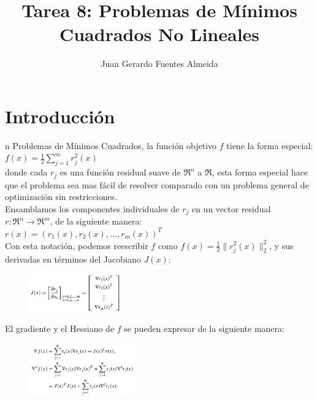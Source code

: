 \documentclass[10pt,journal,compsoc]{styles/IEEEtran}
\title{Tarea 8: Problemas de M\'inimos Cuadrados No Lineales}
\author{Juan Gerardo Fuentes Almeida}
\begin{document}
\maketitle

\IEEEdisplaynontitleabstractindextext

\IEEEpeerreviewmaketitle

\section{Introducci\'on}

n Problemas de Mínimos Cuadrados, la función objetivo $f$ tiene la forma especial:\\
 
 $f(x)=\frac{1}{2} \sum \limits_{j=1}^{m} r^2_j (x)$\\
 
donde cada $r_j$ es una función residual suave de $\Re^n$ a $\Re$, esta forma especial hace que el problema sea mas fácil de resolver comparado con un problema general de optimización sin restricciones.\\

Ensamblamos los componentes individuales de $r_j$ en un vector residual $r:\Re^n \rightarrow \Re^m$, de la siguiente manera:\\

$r(x)=(r_1(x),r_2(x),...,r_m(x))^T$\\

Con esta notación, podemos reescribir $f$ como $f(x)=\frac{1}{2} \parallel r^2_j (x) \parallel _2^2$, y sus derivadas en términos del Jacobiano $J(x)$:\\

\begin{figure}[hbtp]
\centering
\includegraphics[width=0.35\textwidth]{Jacobian.png}
\caption*{}
\end{figure}

El gradiente y el Hessiano de $f$ se pueden expresar de la siguiente manera:\\

\begin{figure}[hbtp]
\centering
\includegraphics[width=0.4\textwidth]{Hessian.png}
\caption*{}
\end{figure}
\end{document}
